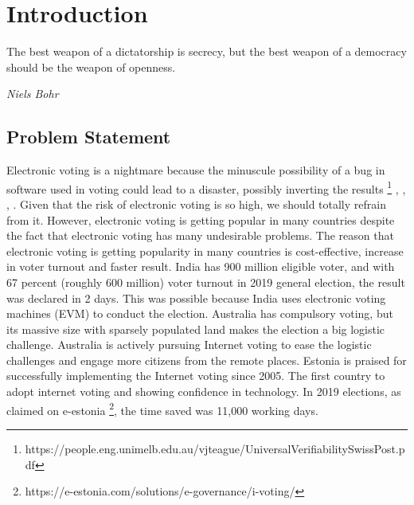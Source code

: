 \chapter{Introduction}
\label{cha:intro}

\epigraph{The best weapon of a dictatorship is secrecy, but the best weapon of a democracy should be the weapon of openness.} 
{\textit{Niels Bohr}} 

\section{Problem Statement}
   Electronic voting is a nightmare because the minuscule possibility of 
   a bug in software used in voting could lead to a disaster, possibly 
   inverting the results
   \footnote{https://people.eng.unimelb.edu.au/vjteague/UniversalVerifiabilitySwissPost.pdf}
   \citep{Wolchok:2010:SAI:1866307.1866309},
   \citep{10.1007/978-3-319-22270-7_3}, \citep{ARANHA2019335},
   \citep{Feldman:2007:SAD:1323111.1323113}.
   Given that the risk of  electronic voting is 
   so high, we should totally refrain from it. However,
   electronic voting is getting popular in many countries
   despite the fact that 
   electronic voting has many undesirable problems.  The reason that 
   electronic voting is getting popularity in many countries is cost-effective, 
   increase in voter turnout  and faster result.  India has 900 million eligible voter, 
   and with 67 percent (roughly 600 million) voter turnout in 2019 general election, 
   the result was declared in 2 days. This was possible because India uses  electronic 
   voting machines (EVM) to conduct the election. Australia has 
   compulsory voting, but its massive size with sparsely populated land makes 
   the election a big logistic challenge.  Australia is actively pursuing Internet voting 
   to ease the logistic challenges and engage more citizens from the remote places. Estonia
   is praised for successfully implementing the Internet voting since 2005. The first country to
   adopt internet voting and showing confidence in technology. In 2019 elections, 
   as claimed on e-estonia \footnote {https://e-estonia.com/solutions/e-governance/i-voting/},
   the time saved was 11,000 working days. 
  
